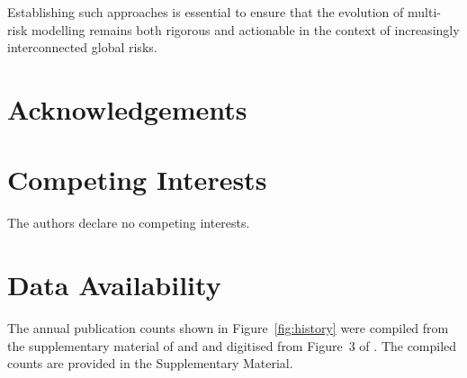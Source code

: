 \documentclass[12pt]{article}
\begin{document}
Establishing such approaches is essential to ensure that the evolution of multi-risk modelling remains both rigorous and actionable in the context of increasingly interconnected global risks.
 
\section*{Acknowledgements}
 
\section*{Competing Interests}
The authors declare no competing interests.

\section*{Data Availability}
The annual publication counts shown in Figure~\ref{fig:history} were compiled from the supplementary material of \citet{Tilloy2019} and \citet{Owolabi2023} and digitised from Figure~3 of \citet{grandjean2025bibliographic}. The compiled counts are provided in the Supplementary Material.
 


 
\end{document}
